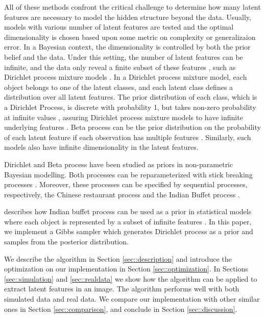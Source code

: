 \documentclass{article}
\begin{document}
All of these methods confront the critical challenge to determine how many latent features are necessary to model the hidden structure beyond the data. Usually, models with various number of latent features are tested and the optimal dimensionality is chosen based upon some metric on complexity or generalizaion error. In a Bayesian context, the dimensionality is controlled by both the prior belief and the data. Under this setting, the number of latent features can be infinite, and the data only reveal a finite subset of these features \citep{rasmussen2001occam}, such as Dirichlet process mixture models \citep{antoniak1974mixtures}. In a Dirichlet process mixture model, each object belongs to one of the latent classes, and each latent class defines a distribution over all latent features. The prior distribution of each class, which is a Dirichlet Process, is discrete with probability 1, but takes non-zero probability at infinite values \citep{teh2010dirichlet}, assuring Dirichlet process mixture models to have infinite underlying features \citep{rasmussen2000infinite}. Beta process can be the prior distribution on the probability of each latent feature if each observation has multiple features \citep{JMLR:v12:griffiths11a}. Similarly, such models also have infinite dimensionality in the latent features.

Dirichlet and Beta process have been studied as priors in non-parametric Bayesian modelling. Both processes can be reparameterized with stick breaking processes \citep{broderick2012beta, paisley2011stick}. Moreover, these processes can be specified by sequential processes, respectively, the Chinese restaurant process \citep{griffiths2004hierarchical} and the Indian Buffet process \citep{thibaux2007hierarchical}. 

\citet{ghahramani2006infinite} describes how Indian buffet process can be used as a prior in statistical models where each object is represented by a subset of infinite features \citep[also see][]{griffiths2005infinite}. In this paper, we implement a Gibbs sampler which generates Dirichlet process as a prior and samples from the posterior distribution. 

We describe the algorithm in Section \ref{sec::description} and introduce the optimization on our implementation in Section \ref{sec::optimization}. In Sections \ref{sec::simulation} and \ref{sec::realdata} we show how the algorithm can be applied to extract latent features in an image. The algorithm performs well with both simulated data and real data. We compare our implementation with other similar ones in Section \ref{sec::comparison}, and conclude in Section \ref{sec::discussion}. 
\end{document}
